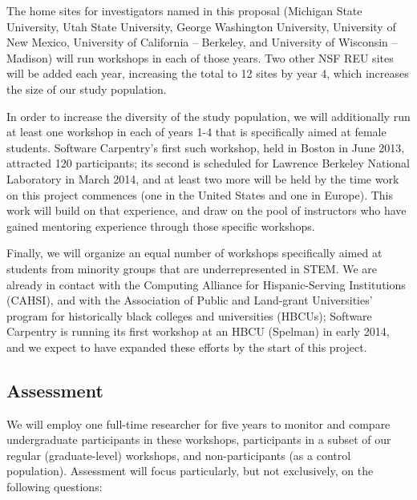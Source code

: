 \documentclass[11pt]{article}
\begin{document}
The home sites for investigators named in this proposal (Michigan
State University, Utah State University, George Washington University,
University of New Mexico, University of California -- Berkeley, and
University of Wisconsin -- Madison) will run workshops in each of
those years.  Two other NSF REU sites will be added each year,
increasing the total to 12 sites by year 4, which increases the size of our study population.

In order to increase the diversity of the study population, we will
additionally run at least one workshop in each of years 1-4 that is
specifically aimed at female students.  Software Carpentry's first
such workshop, held in Boston in June 2013, attracted 120
participants; its second is scheduled for Lawrence Berkeley National
Laboratory in March 2014, and at least two more will be held by the
time work on this project commences (one in the United States and one
in Europe).  This work will build on that experience, and draw on the
pool of instructors who have gained mentoring experience through those
specific workshops.

Finally, we will organize an equal number of workshops specifically
aimed at students from minority groups that are underrepresented in
STEM.  We are already in contact with the Computing Alliance for
Hispanic-Serving Institutions (CAHSI), and with the Association of
Public and Land-grant Universities' program for historically black
colleges and universities (HBCUs); Software Carpentry is running its
first workshop at an HBCU (Spelman) in early 2014, and we expect to
have expanded these efforts by the start of this project.

\subsection{Assessment}

We will employ one full-time researcher for five years to monitor and
compare undergraduate participants in these workshops, participants in
a subset of our regular (graduate-level) workshops, and
non-participants (as a control population).  Assessment will focus
particularly, but not exclusively, on the following questions:
\end{document}
